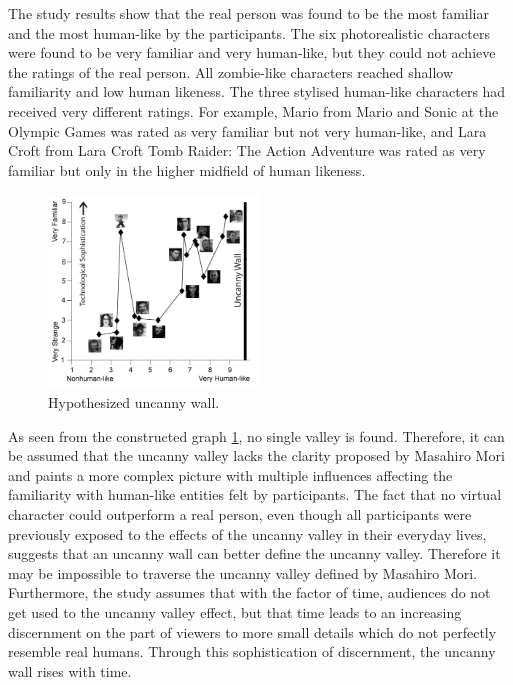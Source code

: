 The study results show that the real person was found to be the most familiar and the most human-like by the participants. The six photorealistic characters were found to be very familiar and very human-like, but they could not achieve the ratings of the real person. All zombie-like characters reached shallow familiarity and low human likeness. 
The three stylised human-like characters had received very different ratings. For example, Mario from Mario and Sonic at the Olympic Games was rated as very familiar but not very human-like, and Lara Croft from Lara Croft Tomb Raider: The Action Adventure was rated as very familiar but only in the higher midfield of human likeness. 
\newpage
\begin{figure} %
    \centering
    \includegraphics[width=0.5\textwidth]{graphics/uncanny_wall_graph.png}
    \caption{Hypothesized uncanny wall.}
    \label{fig:uncannyWallGraph}
\end{figure}
As seen from the constructed graph \ref{fig:uncannyWallGraph}, no single valley is found.
Therefore, it can be assumed that the uncanny valley lacks the clarity proposed by Masahiro Mori and paints a more complex picture with multiple influences affecting the familiarity with human-like entities felt by participants.  The fact that no virtual character could outperform a real person, even though all participants were previously exposed to the effects of the uncanny valley in their everyday lives, suggests that an uncanny wall can better define the uncanny valley. Therefore it may be impossible to traverse the uncanny valley defined by Masahiro Mori. Furthermore, the study assumes that with the factor of time, audiences do not get used to the uncanny valley effect, but that time leads to an increasing discernment on the part of viewers to more small details which do not perfectly resemble real humans. Through this sophistication of discernment, the uncanny wall rises with time.\\
